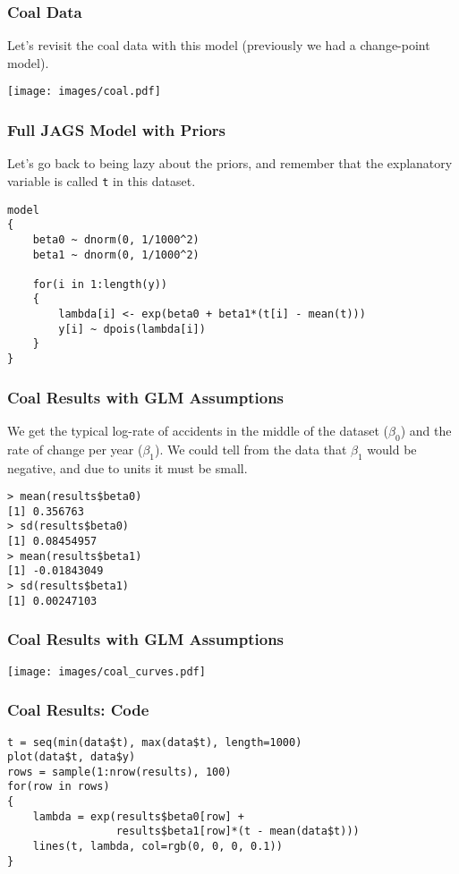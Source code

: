 \documentclass{beamer}
\begin{document}
\begin{frame}
\frametitle{Coal Data}
Let's revisit the coal data with this model (previously we had a change-point
model).

\begin{center}
\texttt{[image: images/coal.pdf]}
\end{center}

\end{frame}


\begin{frame}[fragile]
\frametitle{Full JAGS Model with Priors}
Let's go back to being lazy about the priors, and remember that the
explanatory variable is called \texttt{t} in this dataset.
\footnotesize
\begin{verbatim}
model
{
    beta0 ~ dnorm(0, 1/1000^2)
    beta1 ~ dnorm(0, 1/1000^2)

    for(i in 1:length(y))
    {
        lambda[i] <- exp(beta0 + beta1*(t[i] - mean(t)))
        y[i] ~ dpois(lambda[i])
    }
}
\end{verbatim}

\end{frame}


\begin{frame}[fragile]
\frametitle{Coal Results with GLM Assumptions}
We get the typical log-rate of accidents in the middle of the dataset
($\beta_0$) and the rate of change per year ($\beta_1$). We could tell from
the data that $\beta_1$ would be negative, and due to units it must be small.
\footnotesize
\begin{verbatim}
> mean(results$beta0)
[1] 0.356763
> sd(results$beta0)
[1] 0.08454957
> mean(results$beta1)
[1] -0.01843049
> sd(results$beta1)
[1] 0.00247103
\end{verbatim}

\end{frame}


\begin{frame}[fragile]
\frametitle{Coal Results with GLM Assumptions}

\begin{center}
\texttt{[image: images/coal\_curves.pdf]}
\end{center}
\end{frame}


\begin{frame}[fragile]
\frametitle{Coal Results: Code}

\begin{verbatim}
t = seq(min(data$t), max(data$t), length=1000)
plot(data$t, data$y)
rows = sample(1:nrow(results), 100)
for(row in rows)
{
    lambda = exp(results$beta0[row] +
                 results$beta1[row]*(t - mean(data$t)))
    lines(t, lambda, col=rgb(0, 0, 0, 0.1))
}
\end{verbatim}
\end{frame}
\end{document}
